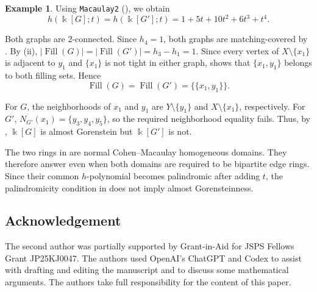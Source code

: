 \documentclass[a4paper,reqno,11pt]{amsart}
\theoremstyle{definition}
\newtheorem{ex}[thm]{Example}
\theoremstyle{remark}
\numberwithin{equation}{section}
\newcommand{\kk}{\Bbbk}
\newcommand{\Fill}{\operatorname{Fill}}
\begin{document}
\begin{ex}
    Using \texttt{Macaulay2} (\cite{Macaulay2}), we obtain
    \[
        h(\kk[G];t)=h(\kk[G'];t)=1+5t+10t^2+6t^3+t^4.
    \]

    Both graphs are $2$-connected.
    Since $h_4=1$, both graphs are matching-covered by .
    By  (ii), $|\Fill(G)|=|\Fill(G')|=h_3-h_1=1$.
    Since every vertex of $X\setminus\{x_1\}$ is adjacent to $y_1$ and $\{x_1\}$ is not tight in either graph,  shows that $\{x_1,y_1\}$ belongs to both filling sets.
    Hence
    \[
        \Fill(G)=\Fill(G')=\{\{x_1,y_1\}\}.
    \]

    For $G$, the neighborhoods of $x_1$ and $y_1$ are $Y\setminus\{y_1\}$ and $X\setminus\{x_1\}$, respectively.
    For $G'$, $N_{G'}(x_1)=\{y_3,y_4,y_5\}$, so the required neighborhood equality fails.
    Thus, by , $\kk[G]$ is almost Gorenstein but $\kk[G']$ is not.
\end{ex}

The two rings in  are normal Cohen--Macaulay homogeneous domains.
They therefore answer \cite[Problem~4.6]{higashitani2016almost} even when both domains are required to be bipartite edge rings.
Since their common $h$-polynomial becomes palindromic after adding $t$, the palindromicity condition in  does not imply almost Gorensteinness.

\subsection*{Acknowledgement}
The second author was partially supported by Grant-in-Aid for JSPS Fellows Grant JP25KJ0047.
The authors used OpenAI's ChatGPT and Codex to assist with drafting and editing the manuscript and to discuss some mathematical arguments.
The authors take full responsibility for the content of this paper.



\end{document}
